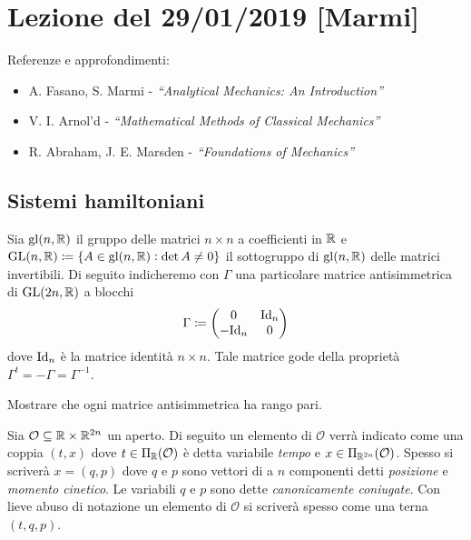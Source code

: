 \section{Lezione del 29/01/2019 [Marmi]}
Referenze e approfondimenti:
\begin{itemize}
    \item A. Fasano, S. Marmi - \emph{``Analytical Mechanics: An Introduction''}
    \item V. I. Arnol'd - \emph{``Mathematical Methods of Classical Mechanics''}
    \item R. Abraham, J. E. Marsden - \emph{``Foundations of Mechanics''}
\end{itemize}

\subsection{Sistemi hamiltoniani}
Sia $ \mathrm{gl}(n, \mathbb{R}) $ il gruppo delle matrici $ n \times n $ a coefficienti in $ \mathbb{R} $ e $ {\mathrm{GL}(n, \mathbb{R}) \coloneqq \{A \in \mathrm{gl}(n, \mathbb{R}) : \det{A} \neq 0\}} $ il sottogruppo di $ \mathrm{gl}(n, \mathbb{R}) $ delle matrici invertibili. Di seguito indicheremo con $ \Gamma $ una particolare matrice antisimmetrica di $ \mathrm{GL}(2n, \mathbb{R}) $ a blocchi
\begin{equation}
    \Gamma \coloneqq
    \begin{pmatrix}
        0 & \mathrm{Id}_{n} \\
        -\mathrm{Id}_{n} & 0 \\
    \end{pmatrix}
\end{equation}
dove $ \mathrm{Id}_n $ è la matrice identità $ n \times n $. Tale matrice gode della proprietà $ \Gamma^t = -\Gamma = \Gamma^{-1} $. \\

\begin{exercise}
    Mostrare che ogni matrice antisimmetrica ha rango pari.
\end{exercise}

Sia $ \mathcal{O} \subseteq \mathbb{R} \times \mathbb{R}^{2n} $ un aperto. Di seguito un elemento di $ \mathcal{O} $ verrà indicato come una coppia $ (t, x) $ dove $ t \in \Pi_{\mathbb{R}}(\mathcal{O}) $ è detta variabile \emph{tempo} e $ x \in \Pi_{\mathbb{R}^{2n}}(\mathcal{O}) $. Spesso si scriverà $ x = (q, p) $ dove $ q $ e $ p $ sono vettori di a $ n $ componenti detti \emph{posizione} e \emph{momento cinetico}. Le variabili $ q $ e $ p $ sono dette \emph{canonicamente coniugate}. Con lieve abuso di notazione un elemento di $ \mathcal{O} $ si scriverà spesso come una terna $ (t, q, p) $. \\

